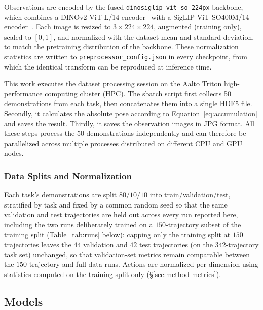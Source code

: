 \documentclass[english,12pt,a4paper,pdftex,elec,utf8]{aaltothesis}
\begin{document}
Observations are encoded by the fused \texttt{dinosiglip-vit-so-224px} backbone, which combines a DINOv2 ViT-L/14 encoder~\cite{oquab2024dinov2learningrobustvisual} with a SigLIP ViT-SO400M/14 encoder~\cite{zhai2023sigmoid}. Each image is resized to
$3\times224\times224$, augmented (training only), scaled to $[0,1]$, and normalized with the dataset mean and standard deviation, to match the pretraining distribution of the backbone. These normalization statistics are written to \texttt{preprocessor\_config.json} in every checkpoint, from which the identical transform can be reproduced at inference time.

This work executes the dataset processing session on the Aalto Triton high-performance computing cluster (HPC). The sbatch script first collects 50 demonstrations from each task, then concatenates them into a single HDF5 file. Secondly, it calculates the absolute pose according to Equation~\ref{eq:accumulation} and saves the result. Thirdly, it saves the observation images in JPG format. All these steps process the 50 demonstrations independently and can therefore be parallelized across multiple processes distributed on different CPU and GPU nodes.


\subsubsection{Data Splits and Normalization}
\label{sec:implementation-data}

Each task's demonstrations are split $80/10/10$ into train/validation/test, stratified by task and fixed by a common random seed so that the same validation and test trajectories are held out across every run reported here, including the two runs deliberately trained on a $150$-trajectory subset of the training split (Table~\ref{tab:runs} below): capping only the training split at $150$ trajectories leaves the $44$ validation and $42$ test trajectories (on the $342$-trajectory task set) unchanged, so that validation-set metrics remain comparable between the $150$-trajectory and full-data
runs. Actions are normalized per dimension using statistics computed on the training split only (\S\ref{sec:method-metrics}).



\subsection{Models}
\label{sec:implementation-models}
\end{document}
